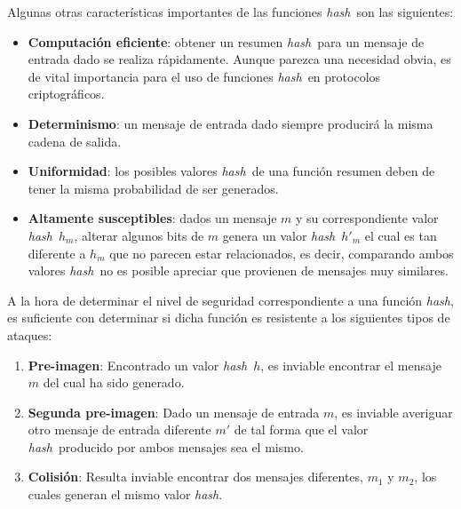 \documentclass[12pt,spanish,listoffigures,listoftables]{tfgetsinf}
\newcommand{\hash}{\textit{hash}}
\begin{document}
Algunas otras características importantes de las funciones \hash~son las siguientes:

\begin{itemize}

    \item \textbf{Computación eficiente}: obtener un resumen \hash~para un mensaje de entrada dado se realiza rápidamente. Aunque parezca una necesidad obvia, es de vital importancia para el uso de funciones \hash~en protocolos criptográficos.
    
    \item \textbf{Determinismo}: un mensaje de entrada dado siempre producirá la misma cadena de salida.
    
    \item \textbf{Uniformidad}: los posibles valores \hash~de una función resumen deben de tener la misma probabilidad de ser generados.
    
    \item \textbf{Altamente susceptibles}: dados un mensaje $m$ y su correspondiente valor \hash~$h_m$, alterar algunos bits de $m$ genera un valor \hash~$h'_m$ el cual es tan diferente a $h_m$ que no parecen estar relacionados, es decir, comparando ambos valores \hash~no es posible apreciar que provienen de mensajes muy similares.
    
\end{itemize}

A la hora de determinar el nivel de seguridad correspondiente a una función \hash, es suficiente con determinar si dicha función es resistente a los siguientes tipos de ataques:

\begin{enumerate}

    \item \textbf{Pre-imagen}: Encontrado un valor \hash~$h$, es inviable encontrar el mensaje $m$ del cual ha sido generado.
    
    \item \textbf{Segunda pre-imagen}: Dado un mensaje de entrada $m$, es inviable averiguar otro mensaje de entrada diferente $m'$ de tal forma que el valor \hash~producido por ambos mensajes sea el mismo.
    
    \item \textbf{Colisión}: Resulta inviable encontrar dos mensajes diferentes, $m_1$ y $m_2$, los cuales generan el mismo valor \hash.
    
\end{enumerate}
\end{document}
